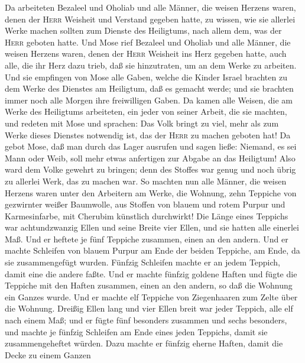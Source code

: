  Da arbeiteten Bezaleel und Oholiab und alle Männer, die
weisen Herzens waren, denen der \textsc{Herr} Weisheit und Verstand
gegeben hatte, zu wissen, wie sie allerlei Werke machen sollten zum
Dienste des Heiligtums, nach allem dem, was der \textsc{Herr} geboten
hatte.  Und Mose rief Bezaleel und Oholiab und alle
Männer, die weisen Herzens waren, denen der \textsc{Herr} Weisheit ins
Herz gegeben hatte, auch alle, die ihr Herz dazu trieb, daß sie
hinzutraten, um an dem Werke zu arbeiten.  Und sie
empfingen von Mose alle Gaben, welche die Kinder Israel brachten zu dem
Werke des Dienstes am Heiligtum, daß es gemacht werde; und sie brachten
immer noch alle Morgen ihre freiwilligen Gaben.  Da kamen
alle Weisen, die am Werke des Heiligtums arbeiteten, ein jeder von
seiner Arbeit, die sie machten,  und redeten mit Mose und
sprachen: Das Volk bringt zu viel, mehr als zum Werke dieses Dienstes
notwendig ist, das der \textsc{Herr} zu machen geboten hat!
 Da gebot Mose, daß man durch das Lager ausrufen und sagen
ließe: Niemand, es sei Mann oder Weib, soll mehr etwas anfertigen zur
Abgabe an das Heiligtum! Also ward dem Volke gewehrt zu bringen;
 denn des Stoffes war genug und noch übrig zu allerlei
Werk, das zu machen war.  So machten nun alle Männer, die
weisen Herzens waren unter den Arbeitern am Werke, die Wohnung, zehn
Teppiche von gezwirnter weißer Baumwolle, aus Stoffen von blauem und
rotem Purpur und Karmesinfarbe, mit Cherubim künstlich durchwirkt!
 Die Länge eines Teppichs war achtundzwanzig Ellen und
seine Breite vier Ellen, und sie hatten alle einerlei Maß.
 Und er heftete je fünf Teppiche zusammen, einen an den
andern.  Und er machte Schleifen von blauem Purpur am
Ende der beiden Teppiche, am Ende, da sie zusammengefügt wurden.
 Fünfzig Schleifen machte er an jedem Teppich, damit eine
die andere faßte.  Und er machte fünfzig goldene Haften
und fügte die Teppiche mit den Haften zusammen, einen an den andern, so
daß die Wohnung ein Ganzes wurde.  Und er machte elf
Teppiche von Ziegenhaaren zum Zelte über die Wohnung. 
Dreißig Ellen lang und vier Ellen breit war jeder Teppich, alle elf nach
einem Maß;  und er fügte fünf besonders zusammen und
sechs besonders,  und machte je fünfzig Schleifen am Ende
eines jeden Teppichs, damit sie zusammengeheftet würden. 
Dazu machte er fünfzig eherne Haften, damit die Decke zu einem Ganzen

